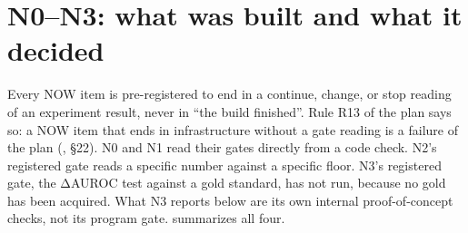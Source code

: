 \section{N0--N3: what was built and what it decided}
\label{sec:evolution}

Every NOW item is pre-registered to end in a continue, change, or stop reading of an experiment
result, never in \enquote{the build finished}. Rule R13 of the plan says so: a NOW item that ends in
infrastructure without a gate reading is a failure of the plan (, \S22).
\evobs{} N0 and N1 read their gates directly from a code check. N2's registered gate reads a specific
number against a specific floor. N3's registered gate, the ΔAUROC test against a gold standard, has
not run, because no gold has been acquired. What N3 reports below are its own internal
proof-of-concept checks, not its program gate. 
summarizes all four.

